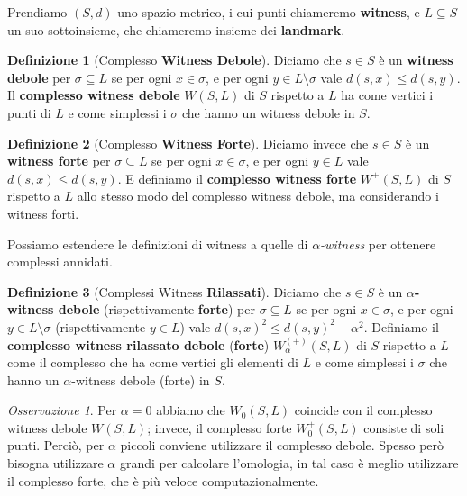 \documentclass[a4paper, 12pt]{article}
\theoremstyle{definition}
\newtheorem{definition}{Definizione}[section]
\theoremstyle{remark}
\newtheorem{remark}[theorem]{Osservazione}
\begin{document}
Prendiamo $(S,d)$ uno spazio metrico, i cui punti chiameremo \textbf{witness}, e $L \subseteq S$ un suo sottoinsieme, che chiameremo insieme dei \textbf{landmark}.

\begin{definition}[Complesso \textbf{Witness Debole}]
    Diciamo che $s \in S$ è un \textbf{witness debole} per $\sigma \subseteq L$ se per ogni $x \in \sigma$, e per ogni $y \in L \setminus \sigma$ vale $d(s,x) \leq d(s,y)$. Il \textbf{complesso witness debole} $W(S,L)$ di $S$ rispetto a $L$ ha come vertici i punti di $L$ e come simplessi i $\sigma$ che hanno un witness debole in $S$.
\end{definition}

\begin{definition}[Complesso \textbf{Witness Forte}]
    Diciamo invece che $s \in S$ è un \textbf{witness forte} per $\sigma \subseteq L$ se per ogni $x \in \sigma$, e per ogni $y \in L$ vale $d(s,x) \leq d(s,y)$. E definiamo il \textbf{complesso witness forte} $W^+(S,L)$ di $S$ rispetto a $L$ allo stesso modo del complesso witness debole, ma considerando i witness forti.
\end{definition}

% 

Possiamo estendere le definizioni di witness a quelle di \textit{$\alpha$-witness} per ottenere complessi annidati.

\begin{definition}[Complessi Witness \textbf{Rilassati}]
    Diciamo che $s \in S$ è un \textbf{$\alpha$-witness debole} (rispettivamente \textbf{forte}) per $\sigma \subseteq L$ se per ogni $x \in \sigma$, e per ogni $y \in L \setminus \sigma$ (rispettivamente $y \in L$) vale $d(s,x)^2 \leq d(s,y)^2 + \alpha^2$. Definiamo il \textbf{complesso witness rilassato debole} (\textbf{forte}) $W_{\alpha}^{(+)}(S,L)$ di $S$ rispetto a $L$ come il complesso che ha come vertici gli elementi di $L$ e come simplessi i $\sigma$ che hanno un $\alpha$-witness debole (forte) in $S$.
\end{definition}

\begin{remark}
    Per $\alpha = 0$ abbiamo che $W_{0}(S,L)$ coincide con il complesso witness debole $W(S,L)$; invece, il complesso forte $W^+_0(S,L)$ consiste di soli punti. Perciò, per $\alpha$ piccoli conviene utilizzare il complesso debole. Spesso però bisogna utilizzare $\alpha$ grandi per calcolare l'omologia, in tal caso è meglio utilizzare il complesso forte, che è più veloce computazionalmente.
\end{remark}
\end{document}
